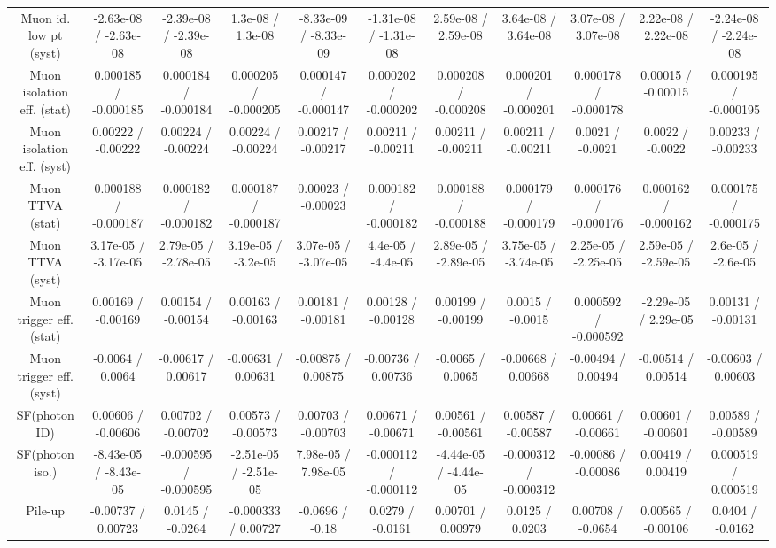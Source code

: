 \begin{table}[htbp]
\begin{center}
\begin{tabular}{|c|c|c|c|c|c|c|c|c|c|c|}
  Muon id. low pt (syst) & -2.63e-08 / -2.63e-08 & -2.39e-08 / -2.39e-08 & 1.3e-08 / 1.3e-08 & -8.33e-09 / -8.33e-09 & -1.31e-08 / -1.31e-08 & 2.59e-08 / 2.59e-08 & 3.64e-08 / 3.64e-08 & 3.07e-08 / 3.07e-08 & 2.22e-08 / 2.22e-08 & -2.24e-08 / -2.24e-08 \\ 
  Muon isolation eff. (stat) & 0.000185 / -0.000185 & 0.000184 / -0.000184 & 0.000205 / -0.000205 & 0.000147 / -0.000147 & 0.000202 / -0.000202 & 0.000208 / -0.000208 & 0.000201 / -0.000201 & 0.000178 / -0.000178 & 0.00015 / -0.00015 & 0.000195 / -0.000195 \\ 
  Muon isolation eff. (syst) & 0.00222 / -0.00222 & 0.00224 / -0.00224 & 0.00224 / -0.00224 & 0.00217 / -0.00217 & 0.00211 / -0.00211 & 0.00211 / -0.00211 & 0.00211 / -0.00211 & 0.0021 / -0.0021 & 0.0022 / -0.0022 & 0.00233 / -0.00233 \\ 
  Muon TTVA (stat) & 0.000188 / -0.000187 & 0.000182 / -0.000182 & 0.000187 / -0.000187 & 0.00023 / -0.00023 & 0.000182 / -0.000182 & 0.000188 / -0.000188 & 0.000179 / -0.000179 & 0.000176 / -0.000176 & 0.000162 / -0.000162 & 0.000175 / -0.000175 \\ 
  Muon TTVA (syst) & 3.17e-05 / -3.17e-05 & 2.79e-05 / -2.78e-05 & 3.19e-05 / -3.2e-05 & 3.07e-05 / -3.07e-05 & 4.4e-05 / -4.4e-05 & 2.89e-05 / -2.89e-05 & 3.75e-05 / -3.74e-05 & 2.25e-05 / -2.25e-05 & 2.59e-05 / -2.59e-05 & 2.6e-05 / -2.6e-05 \\ 
  Muon trigger eff. (stat) & 0.00169 / -0.00169 & 0.00154 / -0.00154 & 0.00163 / -0.00163 & 0.00181 / -0.00181 & 0.00128 / -0.00128 & 0.00199 / -0.00199 & 0.0015 / -0.0015 & 0.000592 / -0.000592 & -2.29e-05 / 2.29e-05 & 0.00131 / -0.00131 \\ 
  Muon trigger eff. (syst) & -0.0064 / 0.0064 & -0.00617 / 0.00617 & -0.00631 / 0.00631 & -0.00875 / 0.00875 & -0.00736 / 0.00736 & -0.0065 / 0.0065 & -0.00668 / 0.00668 & -0.00494 / 0.00494 & -0.00514 / 0.00514 & -0.00603 / 0.00603 \\ 
  SF(photon ID) & 0.00606 / -0.00606 & 0.00702 / -0.00702 & 0.00573 / -0.00573 & 0.00703 / -0.00703 & 0.00671 / -0.00671 & 0.00561 / -0.00561 & 0.00587 / -0.00587 & 0.00661 / -0.00661 & 0.00601 / -0.00601 & 0.00589 / -0.00589 \\ 
  SF(photon iso.) & -8.43e-05 / -8.43e-05 & -0.000595 / -0.000595 & -2.51e-05 / -2.51e-05 & 7.98e-05 / 7.98e-05 & -0.000112 / -0.000112 & -4.44e-05 / -4.44e-05 & -0.000312 / -0.000312 & -0.00086 / -0.00086 & 0.00419 / 0.00419 & 0.000519 / 0.000519 \\ 
  Pile-up & -0.00737 / 0.00723 & 0.0145 / -0.0264 & -0.000333 / 0.00727 & -0.0696 / -0.18 & 0.0279 / -0.0161 & 0.00701 / 0.00979 & 0.0125 / 0.0203 & 0.00708 / -0.0654 & 0.00565 / -0.00106 & 0.0404 / -0.0162 \\ 

\end{tabular}
\end{center}
\end{table}
